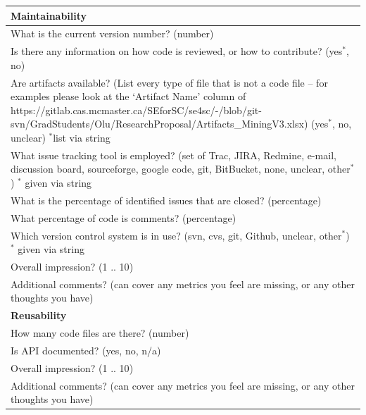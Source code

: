 \documentclass[letterpaper,cleveref]{lipics-v2019}
\begin{document}
\def\arraystretch{1.4}
\begin{tabular}{p{14cm}}
	\hline	
	\textbf{Maintainability}\\
	\hline
	What is the current version number? (number)\\
	Is there any information on how code is reviewed, or how to contribute?
	({yes$^*$, no})\\
	Are artifacts available? (List every type of file that is not a code file –
	for examples please look at the ‘Artifact Name’ column of
	https://gitlab.cas.mcmaster.ca/SEforSC/se4sc/-/blob/git-svn/GradStudents/Olu/ResearchProposal/Artifacts\_MiningV3.xlsx)
	({yes$^*$, no, unclear}) $^*$list via string\\
	What issue tracking tool is employed? (set of {Trac, JIRA, Redmine, e-mail,
	discussion board, sourceforge, google code, git, BitBucket, none, unclear,
	other$^*$}) $^*$ given via string\\
	What is the percentage of identified issues that are closed? (percentage)\\
	What percentage of code is comments? (percentage)\\
	Which version control system is in use? ({svn, cvs, git, Github, unclear,
	other$^*$}) $^*$ given via string\\
	Overall impression? ({1 .. 10})\\
	Additional comments? (can cover any metrics you feel are missing, or any other
	thoughts you have)\\
	\hline		
	\textbf{Reusability}\\
	\hline
	How many code files are there? (number)\\
	Is API documented? ({yes, no, n/a})\\
	Overall impression? ({1 .. 10})\\
	Additional comments? (can cover any metrics you feel are missing, or any other
	thoughts you have)\\
	\hline		
\end{tabular}
\end{document}
